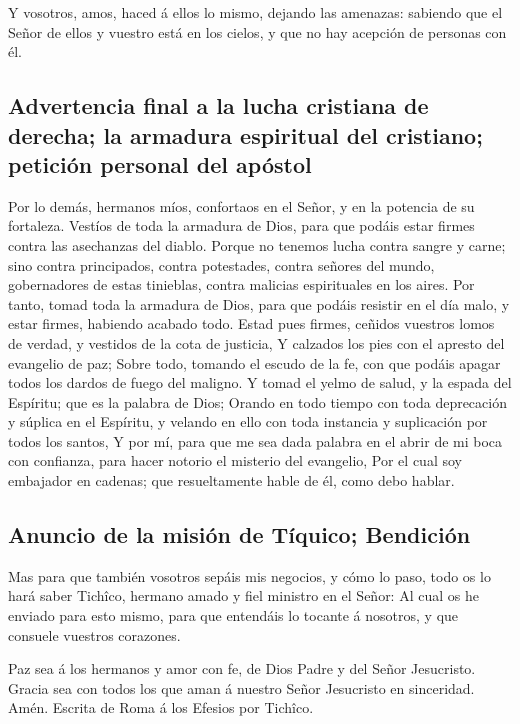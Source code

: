  Y vosotros, amos, haced á ellos lo mismo, dejando las
amenazas: sabiendo que el Señor de ellos y vuestro está en los cielos, y
que no hay acepción de personas con él.

\hypertarget{advertencia-final-a-la-lucha-cristiana-de-derecha-la-armadura-espiritual-del-cristiano-peticiuxf3n-personal-del-apuxf3stol}{%
\subsection{Advertencia final a la lucha cristiana de derecha; la
armadura espiritual del cristiano; petición personal del
apóstol}\label{advertencia-final-a-la-lucha-cristiana-de-derecha-la-armadura-espiritual-del-cristiano-peticiuxf3n-personal-del-apuxf3stol}}

 Por lo demás, hermanos míos, confortaos en el Señor, y
en la potencia de su fortaleza.  Vestíos de toda la
armadura de Dios, para que podáis estar firmes contra las asechanzas del
diablo.  Porque no tenemos lucha contra sangre y carne;
sino contra principados, contra potestades, contra señores del mundo,
gobernadores de estas tinieblas, contra malicias espirituales en los
aires.  Por tanto, tomad toda la armadura de Dios, para
que podáis resistir en el día malo, y estar firmes, habiendo acabado
todo.  Estad pues firmes, ceñidos vuestros lomos de
verdad, y vestidos de la cota de justicia,  Y calzados
los pies con el apresto del evangelio de paz;  Sobre
todo, tomando el escudo de la fe, con que podáis apagar todos los dardos
de fuego del maligno.  Y tomad el yelmo de salud, y la
espada del Espíritu; que es la palabra de Dios;  Orando
en todo tiempo con toda deprecación y súplica en el Espíritu, y velando
en ello con toda instancia y suplicación por todos los santos,
 Y por mí, para que me sea dada palabra en el abrir de mi
boca con confianza, para hacer notorio el misterio del evangelio,
 Por el cual soy embajador en cadenas; que resueltamente
hable de él, como debo hablar.

\hypertarget{anuncio-de-la-misiuxf3n-de-tuxedquico-bendiciuxf3n}{%
\subsection{Anuncio de la misión de Tíquico;
Bendición}\label{anuncio-de-la-misiuxf3n-de-tuxedquico-bendiciuxf3n}}

 Mas para que también vosotros sepáis mis negocios, y
cómo lo paso, todo os lo hará saber Tichîco, hermano amado y fiel
ministro en el Señor:  Al cual os he enviado para esto
mismo, para que entendáis lo tocante á nosotros, y que consuele vuestros
corazones.

 Paz sea á los hermanos y amor con fe, de Dios Padre y
del Señor Jesucristo.  Gracia sea con todos los que aman
á nuestro Señor Jesucristo en sinceridad. Amén. Escrita de Roma á los
Efesios por Tichîco.

